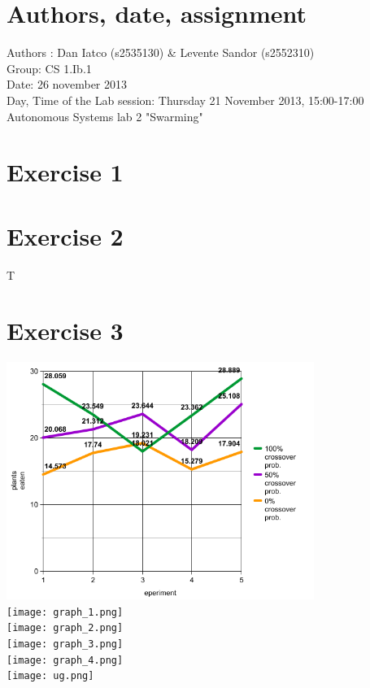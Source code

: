 \documentclass[a4paper,10pt]{article}
\begin{document}
\section*{Authors, date, assignment}
Authors : Dan Iatco (s2535130) \& Levente Sandor (s2552310)\\
Group: CS 1.Ib.1\\
Date:  26 november 2013\\
Day, Time of the Lab session: Thursday 21 November 2013, 15:00-17:00\\
Autonomous Systems lab 2 "Swarming"\\

\section*{Exercise 1}

\section*{Exercise 2}
T

\section*{Exercise 3}

\includegraphics[width=10cm]{graph.png}\\
\texttt{[image: graph\_1.png]}\\
\texttt{[image: graph\_2.png]}\\
\texttt{[image: graph\_3.png]}\\
\texttt{[image: graph\_4.png]}\\
\texttt{[image: ug.png]}\\
\end{document}
